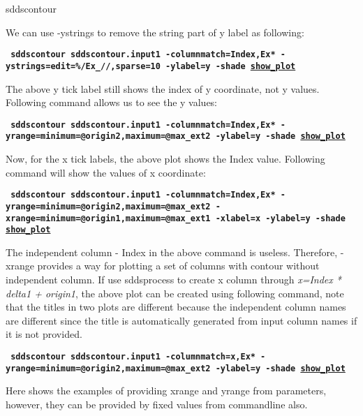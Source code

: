 \begin{sddsprog}{sddscontour}
\begin{itemize}
        We can use -ystrings to remove the string part of y label as following:
        \begin{flushleft}{\tt \bf
            sddscontour sddscontour.input1 -columnmatch=Index,Ex* -ystrings=edit=\%/Ex\_//,sparse=10 -ylabel=y -shade    \href{https://ops.aps.anl.gov/manuals/example_files/sddscontour2_img.html}{show\_plot}
        }\end{flushleft}

        The above y tick label still shows the index of y coordinate, not y values. Following command allows us to see the y values:
        \begin{flushleft}{\tt \bf
            sddscontour sddscontour.input1 -columnmatch=Index,Ex* -yrange=minimum=@origin2,maximum=@max\_ext2 -ylabel=y -shade
        \href{https://ops.aps.anl.gov/manuals/example_files/sddscontour3_img.html}{show\_plot}
        }\end{flushleft}

        Now, for the x tick labels, the above plot shows the Index value. Following command will show the values of x coordinate:

        \begin{flushleft}{\tt \bf
        sddscontour sddscontour.input1 -columnmatch=Index,Ex* -yrange=minimum=@origin2,maximum=@max\_ext2 -xrange=minimum=@origin1,maximum=@max\_ext1 -xlabel=x -ylabel=y  -shade   \href{https://ops.aps.anl.gov/manuals/example_files/sddscontour4_img.html}{show\_plot}
        }\end{flushleft}

        The independent column - Index in the above command is useless. Therefore, -xrange provides a way for plotting a set of
columns with contour without independent column. If use sddsprocess to create x column through {\em x=Index * delta1 + origin1}, the above plot can be created using following command, note that the titles in two plots are different because the independent column names are different since the title is automatically generated from input column names if it is not provided.

        \begin{flushleft}{\tt \bf
        sddscontour sddscontour.input1 -columnmatch=x,Ex* -yrange=minimum=@origin2,maximum=@max\_ext2 -ylabel=y -shade   \href{https://ops.aps.anl.gov/manuals/example_files/sddscontour5_img.html}{show\_plot}
        }\end{flushleft}

       Here shows the examples of providing xrange and yrange from parameters, however, they can be provided by fixed values from commandline also.


\end{itemize}
\end{sddsprog}

